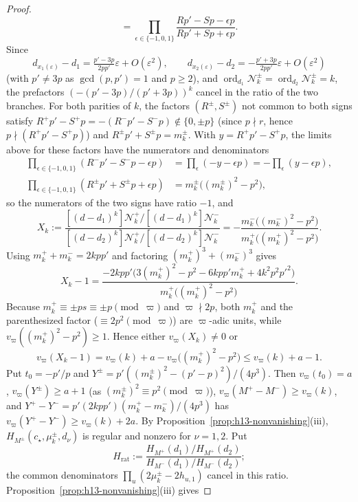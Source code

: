 \documentclass[twoside,10pt]{article}
\numberwithin{equation}{section}
\theoremstyle{slbody}
\theoremstyle{definition}
\theoremstyle{remark}
\newcommand{\ord}{\operatorname{ord}}
\begin{document}
\begin{proof}
\[ =\prod_{\epsilon\in\{-1,0,1\}}\frac{Rp'-Sp-\epsilon p}{Rp'+Sp+\epsilon p}.
\]
Since
\[
 d_{x_1(\varepsilon)}-d_1=\tfrac{p'-3p}{2pp'}\varepsilon+O(\varepsilon^2),\qquad
 d_{x_2(\varepsilon)}-d_2=-\tfrac{p'+3p}{2pp'}\varepsilon+O(\varepsilon^2)
\]
(with \(p'\neq3p\) as \(\gcd(p,p')=1\) and \(p\geq2\)), and
\(\ord_{d_1}\mathcal N^\pm_k=\ord_{d_2}\mathcal N^\pm_k=k\), the prefactors
\((-(p'-3p)/(p'+3p))^k\) cancel in the ratio of the two branches.  For both
parities of \(k\), the factors \((R^\pm,S^\pm)\) not common to both signs
satisfy \(R^+p'-S^+p=-(R^-p'-S^-p)\notin\{0,\pm p\}\) (since \(p\nmid r\),
hence \(p\nmid(R^+p'-S^+p)\)) and \(R^\pm p'+S^\pm p=m^\pm_k\).  With
\(y=R^+p'-S^+p\), the limits above for these factors have the numerators and
denominators
\[
 \begin{aligned}
  \prod_{\epsilon\in\{-1,0,1\}}(R^-p'-S^-p-\epsilon p)
  &=\prod_{\epsilon}(-y-\epsilon p)=-\prod_{\epsilon}(y-\epsilon p),\\
  \prod_{\epsilon\in\{-1,0,1\}}(R^\pm p'+S^\pm p+\epsilon p)
  &=m^\pm_k\bigl((m^\pm_k)^2-p^2\bigr),
 \end{aligned}
\]
so the numerators of the two signs have ratio \(-1\), and
\[
 X_k:=\frac{[(d-d_1)^k]\mathcal N^+_k\big/[(d-d_1)^k]\mathcal N^-_k}
          {[(d-d_2)^k]\mathcal N^+_k\big/[(d-d_2)^k]\mathcal N^-_k}
 =-\frac{m^-_k\bigl((m^-_k)^2-p^2\bigr)}{m^+_k\bigl((m^+_k)^2-p^2\bigr)}.
\]
Using \(m^+_k+m^-_k=2kpp'\) and factoring \((m^+_k)^3+(m^-_k)^3\) gives
\[
 X_k-1=\frac{-2kpp'\bigl(3(m^+_k)^2-p^2-6kpp'm^+_k+4k^2p^2p'^2\bigr)}
            {m^+_k\bigl((m^+_k)^2-p^2\bigr)}.
\]
Because \(m^+_k\equiv\pm ps\equiv\pm p\pmod\varpi\) and \(\varpi\nmid2p\), both
\(m^+_k\) and the parenthesized factor (\(\equiv2p^2\pmod\varpi\)) are
\(\varpi\)-adic units, while \(v_\varpi((m^+_k)^2-p^2)\geq1\).  Hence either
\(v_\varpi(X_k)\neq0\) or
\[
 v_\varpi(X_k-1)=v_\varpi(k)+a-v_\varpi\bigl((m^+_k)^2-p^2\bigr)\leq v_\varpi(k)+a-1.
\]
Put \(t_0=-p'/p\) and \(Y^\pm=p'((m^\pm_k)^2-(p'-p)^2)/(4p^3)\).  Then
\(v_\varpi(t_0)=a\), \(v_\varpi(Y^\pm)\geq a+1\) (as
\((m^\pm_k)^2\equiv p^2\pmod\varpi\)), \(v_\varpi(M^+-M^-)\geq v_\varpi(k)\), and
\(Y^+-Y^-=p'(2kpp')(m^+_k-m^-_k)/(4p^3)\) has
\(v_\varpi(Y^+-Y^-)\geq v_\varpi(k)+2a\).  By
Proposition~\ref{prop:h13-nonvanishing}(iii),
\(H_{M^\pm}(c_\star,\mu^\pm_k,d_\nu)\) is regular and nonzero for \(\nu=1,2\).
Put
\[
 H_{\mathrm{rat}}:=\frac{H_{M^+}(d_1)/H_{M^+}(d_2)}{H_{M^-}(d_1)/H_{M^-}(d_2)};
\]
the common denominators \(\prod_u(2\mu^\pm_k-2h_{u,1})\) cancel in this ratio.
Proposition~\ref{prop:h13-nonvanishing}(iii) gives

\end{proof}
\end{document}
